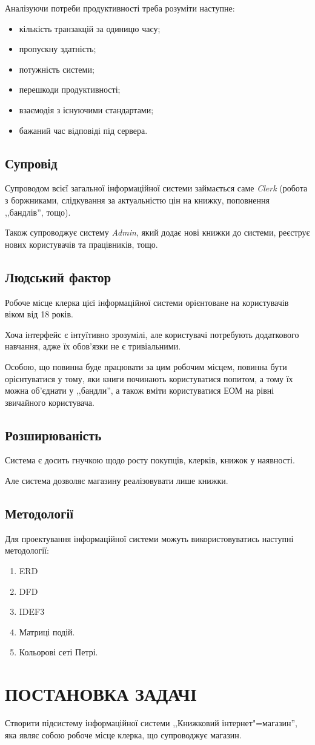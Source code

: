 \documentclass[a4paper,notitlepage,headsepline,pdftex,oneside]{report}
\newcommand{\setfontsize}[1]{\fontsize{#1pt}{#1pt}\selectfont}
\newcommand{\Chapter}[1]{\chapter{#1} \renewcommand{\baselinestretch}{1.5}\setfontsize{14pt}}
\newenvironment{enumerator}{\begin{enumerate}[leftmargin=1.6cm]%
  \setlength{\itemsep}{1pt}%
  \setlength{\parskip}{0pt}
  \setlength{\parsep}{0pt}
  }{\end{enumerate}}
\newenvironment{itemizer}{\begin{itemize}[leftmargin=1.45cm]%
  \setlength{\itemsep}{1pt}%
  \setlength{\parskip}{0pt}
  \setlength{\parsep}{0pt}
  }{\end{itemize}}
\newcommand{\Section}[1]{\section{#1} \renewcommand{\baselinestretch}{1.5}\setfontsize{14pt}}
\begin{document}
    Аналізуючи потреби продуктивності треба розуміти наступне:
    \begin{itemizer}
      \item кількість транзакцій за одиницю часу;
      \item пропускну здатність;
      \item потужність системи;
      \item перешкоди продуктивності;
      \item взаємодія з існуючими стандартами;
      \item бажаний час відповіді під сервера.
    \end{itemizer}
  \Section{Супровід}
    Супроводом всієї загальної інформаційної системи займається саме
    \emph{Clerk} (робота з боржниками, слідкування за актуальністю цін на
    книжку, поповнення ,,бандлів'', тощо).

    Також супроводжує систему \emph{Admin}, який додає нові книжки до системи,
    реєструє нових користувачів та працівників, тощо.
  \Section{Людський фактор}
    Робоче місце клерка цієї інформаційної системи орієнтоване на користувачів
    віком від 18 років.

    Хоча інтерфейс є інтуїтивно зрозумілі, але користувачі потребують
    додаткового навчання, адже їх обов’язки не є тривіальними.

    Особою, що повинна буде працювати за цим робочим місцем, повинна бути
    орієнтуватися у тому, яки книги починають користуватися попитом, а тому їх
    можна об’єднати у ,,бандли'', а також вміти користуватися ЕОМ на рівні
    звичайного користувача.
  \Section{Розширюваність}
    Система є досить гнучкою щодо росту покупців, клерків, книжок у наявності.

    Але система дозволяє магазину реалізовувати лише книжки.
  \Section{Методології}
    Для проектування інформаційної системи можуть використовуватись наступні
    методології:
    \begin{enumerator}
      \item ERD
      \item DFD
      \item IDEF3
      \item Матриці подій.
      \item Кольорові сеті Петрі.
    \end{enumerator}
  \clearpage
\Chapter{ПОСТАНОВКА ЗАДАЧІ}
  Створити підсистему інформаційної системи ,,Книжковий інтернет"=магазин'',
  яка являє собою робоче місце клерка, що супроводжує магазин.
\end{document}
